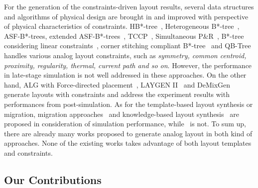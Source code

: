For the generation of the constraints-driven layout results, several data structures and algorithms of physical design are brought in and improved with perspective of physical characteristics of constraints. HB*-tree~\cite{Lin:2008uc}, Heterogeneous B*-tree~\cite{Chou:2011dj}, ASF-B*-trees\cite{PoHungLin:2009gx,Lin:2007vp}, extended ASF-B*-trees~\cite{Lin:2010vt}, TCCP~\cite{Lin:2011gz}, Simultaneous P\&R~\cite{SAPR_DAC13}, B*-tree considering linear constraints~\cite{Strasser:2008kf}, corner stitching compliant B*-tree~\cite{CBTree_ICCAD11} and QB-Tree~\cite{Wu:2016jw} handles various analog layout constraints, such as {\it symmetry, common centroid, proximity, regularity, thermal, current path and so on}. However, the performance in late-stage simulation is not well addressed in these approaches. On the other hand, ALG with Force-directed placement~\cite{AnaLayoutGen_TCAD09}, LAYGEN II~\cite{LAYGENII_TCAD13} and DeMixGen~\cite{Lin:2016dmg} generate layouts with constraints and address the experiment results with performances from post-simulation. As for the template-based layout synthesis or migration, migration approaches~\cite{Bhattacharya:cw,cart-hammouda-dac06,Jangkrajarng:2006cn,Zhang:2008fh,ZhengLiu:2010cy,Weng:2011gz,Chin_DMR_ICCAD2013,pcpan_adm_tcad15} and knowledge-based layout synthesis~\cite{Wu:2015ix,Lourenco:2016dv} are proposed in consideration of simulation performance, while~\cite{Wu:2015ds} is not. To sum up, there are already many works proposed to generate analog layout in both kind of approaches. None of the existing works takes advantage of both layout templates and constraints.


\subsection{Our Contributions}
